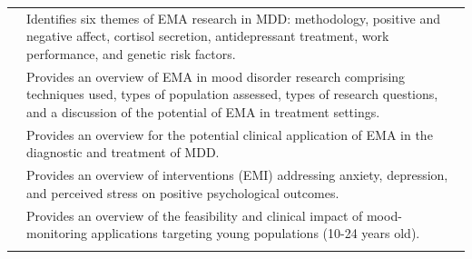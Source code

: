 \documentclass[]{book}
\begin{document}
\begin{longtable}[]{@{}ll@{}}
\begin{minipage}[t]{0.33\columnwidth}\raggedright\strut
\citet{Telford2012}\strut
\end{minipage} & \begin{minipage}[t]{0.61\columnwidth}\raggedright\strut
Identifies six themes of EMA research in MDD: methodology, positive and
negative affect, cortisol secretion, antidepressant treatment, work
performance, and genetic risk factors.\strut
\end{minipage}\tabularnewline
\begin{minipage}[t]{0.33\columnwidth}\raggedright\strut
\citet{Wenze2010}\strut
\end{minipage} & \begin{minipage}[t]{0.61\columnwidth}\raggedright\strut
Provides an overview of EMA in mood disorder research comprising
techniques used, types of population assessed, types of research
questions, and a discussion of the potential of EMA in treatment
settings.\strut
\end{minipage}\tabularnewline
\begin{minipage}[t]{0.33\columnwidth}\raggedright\strut
\citet{Wichers2011}\strut
\end{minipage} & \begin{minipage}[t]{0.61\columnwidth}\raggedright\strut
Provides an overview for the potential clinical application of EMA in
the diagnostic and treatment of MDD.\strut
\end{minipage}\tabularnewline
\begin{minipage}[t]{0.33\columnwidth}\raggedright\strut
\citet{Versluis2016}\strut
\end{minipage} & \begin{minipage}[t]{0.61\columnwidth}\raggedright\strut
Provides an overview of interventions (EMI) addressing anxiety,
depression, and perceived stress on positive psychological
outcomes.\strut
\end{minipage}\tabularnewline
\begin{minipage}[t]{0.33\columnwidth}\raggedright\strut
\citet{Dubad2018}\strut
\end{minipage} & \begin{minipage}[t]{0.61\columnwidth}\raggedright\strut
Provides an overview of the feasibility and clinical impact of
mood-monitoring applications targeting young populations (10-24 years
old).\strut
\end{minipage}\tabularnewline
\begin{minipage}[t]{0.33\columnwidth}\raggedright\strut

\end{minipage}
\end{longtable}
\end{document}
